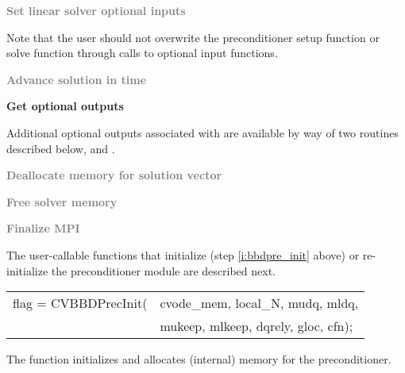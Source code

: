 \begin{Steps}
\item
  \textcolor{gray}{\bf Set linear solver optional inputs}

  Note that the user should not overwrite the preconditioner setup function 
  or solve function through calls to {\cvspils} optional input functions.

\item
  \textcolor{gray}{\bf Advance solution in time}

\item
  {\bf Get optional outputs}

  Additional optional outputs associated with {\cvbbdpre} are available by 
  way of two routines described below,
   and .

\item
  \textcolor{gray}{\bf Deallocate memory for solution vector}

\item
  \textcolor{gray}{\bf Free solver memory}
  
\item 
  \textcolor{gray}{\bf Finalize MPI}

\end{Steps}
The user-callable functions that initialize (step \ref{i:bbdpre_init} above) or re-initialize
the {\cvbbdpre} preconditioner module are described next.
{
   \begin{tabular}[t]{@{}r@{}l@{}}
     flag = CVBBDPrecInit(&cvode\_mem, local\_N, mudq, mldq, \\
                          &mukeep, mlkeep, dqrely, gloc, cfn);
   \end{tabular}
}
{
  The function  initializes and allocates (internal)
  memory for the {\cvbbdpre} preconditioner.
}
